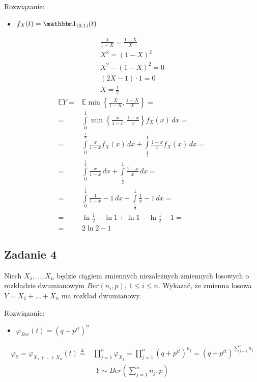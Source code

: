 Rozwiązanie:
\begin{itemize}
\item $ f_X(t)=\mathbbm1_{(0,1)}(t) $
\end{itemize}
\begin{gather*}
\frac{X}{1-X}=\frac{1-X}{X}\\
X^2=\left(1-X\right)^2\\
X^2-\left(1-X\right)^2=0\\
\left(2X-1\right)\cdot 1=0\\
X=\tfrac{1}{2}
\end{gather*}
\begin{align*}
\mathbb E Y=&\mathbb E \min\left\{\tfrac{X}{1-X},\tfrac{1-X}{X}\right\}
=\\=&
\int\limits_{0}^{1} \min\left\{\tfrac{x}{1-x},\tfrac{1-x}{x}\right\}f_X(x)\,dx
=\\=&
\int\limits_{0}^{\frac{1}{2}}\tfrac{x}{1-x}f_X(x)\,dx
+
\int\limits_{\frac{1}{2}}^{1}\tfrac{1-x}{x}f_X(x)\,dx
=\\=&
\int\limits_{0}^{\frac{1}{2}}\frac{x}{1-x}\,dx
+
\int\limits_{\frac{1}{2}}^{1}\frac{1-x}{x}\,dx
=\\=&
\int\limits_{0}^{\frac{1}{2}}\frac{1}{1-x}-1\,dx
+
\int\limits_{\frac{1}{2}}^{1}\frac{1}{x}-1\,dx
=\\=&
\ln \tfrac{1}{2}-\ln 1+\ln1-\ln\tfrac{1}{2}-1
=\\=&
2\ln2-1
\end{align*}


\subsection*{Zadanie 4}
Niech $ X_1,\dots,X_n$ będzie ciągiem zmiennych niezależnych zmiennych losowych o rozkładzie dwumianowym $ Ber(n_i,p) $, $ 1\le i\le n $. Wykazać, że zmienna losowa $ Y=X_1+\dots+X_n $ ma rozkład dwumianowy.

Rozwiązanie:
\begin{itemize}
\item $ \varphi _{Ber}(t)=\left(q+p^{it}\right)^n$
\end{itemize}

\begin{align*}
\varphi_{Y}=\varphi_{X_1+\dots+X_n}(t)\stackrel{\Perp}{=}&
\prod_{j=1}^{n}\varphi_{X_j}
=
\prod_{j=1}^{n}\left(q+p^{it}\right)^{n_j}
=
\left(q+p^{it}\right)^{\sum_{j=1}^{n}n_j}
\end{align*}
\begin{gather*}
Y\sim Ber\left(\sum_{j=1}^{n}n_j,p\right)
\end{gather*}



